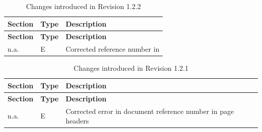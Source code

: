\documentclass[a4paper,10pt]{article}
\begin{document}
\begin{longtable}{|p{1.5cm}|p{1cm}|p{8cm}|}
\caption{Changes introduced in Revision 1.2.2} \\
\hline
\rowcolor{light-gray}
\textbf{Section} & \textbf{Type} & \textbf{Description} \\
\hline\hline
\endfirsthead
\rowcolor{light-gray}
\textbf{Section} & \textbf{Type} & \textbf{Description} \\
\hline\hline
\endhead
n.a. & E & Corrected reference number in \cite{ref:um}\\
\hline
\end{longtable}

\begin{longtable}{|p{1.5cm}|p{1cm}|p{8cm}|}
\caption{Changes introduced in Revision 1.2.1} \\
\hline
\rowcolor{light-gray}
\textbf{Section} & \textbf{Type} & \textbf{Description} \\
\hline\hline
\endfirsthead
\rowcolor{light-gray}
\textbf{Section} & \textbf{Type} & \textbf{Description} \\
\hline\hline
\endhead
n.a. & E & Corrected error in document reference number in page headers\\
\hline
\end{longtable}

\newpage
\end{document}
